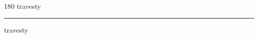 
\begin{frame}
\begin{center}
\begin{turn}{180}
{\fontsize{2.5cm}{1em}\selectfont travesty}
\end{turn}
\vspace{1em}\par  
\hrule
\vspace{1em}\par  
{\fontsize{2.5cm}{1em}\selectfont travesty}
\end{center}
\end{frame}
